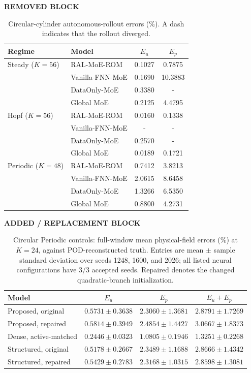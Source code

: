 \documentclass{article}
\providecommand{\DIFaddbegin}{} %
\providecommand{\DIFaddend}{} %
\providecommand{\DIFdelbegin}{} %
\providecommand{\DIFdelend}{} %
\begin{document}
\DIFdelbegin 
{\color{red}
\begin{table}[H]
\color{red}\noindent\textbf{REMOVED BLOCK}\par
\centering
\caption{Circular-cylinder autonomous-rollout errors (\%). A dash indicates that the rollout diverged.}
\label{old:tab:circular_full_reorg}
\small
\setlength{\tabcolsep}{4pt}
\begin{tabular}{llcc}
\toprule
Regime & Model & $E_u$ & $E_p$ \\
\midrule
Steady ($K=56$)
& RAL-MoE-ROM & 0.1027 & 0.7875 \\
& Vanilla-FNN-MoE & 0.1690 & 10.3883 \\
& DataOnly-MoE & 0.3380 & - \\
& Global MoE & 0.2125 & 4.4795 \\
\midrule
Hopf ($K=56$)
& RAL-MoE-ROM & 0.0160 & 0.1338 \\
& Vanilla-FNN-MoE & - & - \\
& DataOnly-MoE & 0.2570 & - \\
& Global MoE & 0.0189 & 0.1721 \\
\midrule
Periodic ($K=48$)
& RAL-MoE-ROM & 0.7412 & 3.8213 \\
& Vanilla-FNN-MoE & 2.0615 & 8.6458 \\
& DataOnly-MoE & 1.3266 & 6.5350 \\
& Global MoE & 0.8800 & 4.2731 \\
\bottomrule
\end{tabular}
\end{table}
}
\DIFdelend \DIFaddbegin 
{\color{blue}
\begin{table}[H]
\color{blue}\noindent\textbf{ADDED / REPLACEMENT BLOCK}\par
\centering
\caption{Circular Periodic controls: full-window mean physical-field
errors (\%) at $K=24$, against POD-reconstructed truth. Entries are mean
$\pm$ sample standard deviation over seeds 1248, 1600, and 2026; all
listed neural configurations have 3/3 accepted seeds. Repaired denotes
the changed quadratic-branch initialization.}
\label{tab:circular_full_reorg}
\small
\setlength{\tabcolsep}{4pt}
\begin{tabular}{@{}lccc@{}}
\toprule
Model & $E_u$ & $E_p$ & $E_u+E_p$\\
\midrule
Proposed, original & $0.5731\pm0.3638$ & $2.3060\pm1.3681$ & $2.8791\pm1.7269$\\
Proposed, repaired & $0.5814\pm0.3949$ & $2.4854\pm1.4427$ & $3.0667\pm1.8373$\\
Dense, active-matched & $\mathbf{0.2446\pm0.0323}$ & $\mathbf{1.0805\pm0.1946}$ & $\mathbf{1.3251\pm0.2268}$\\
Structured, original & $0.5178\pm0.2667$ & $2.3489\pm1.1688$ & $2.8666\pm1.4342$\\
Structured, repaired & $0.5429\pm0.2783$ & $2.3168\pm1.0315$ & $2.8598\pm1.3081$\\
\bottomrule
\end{tabular}
\end{table}
}
\DIFaddend 
\end{document}
